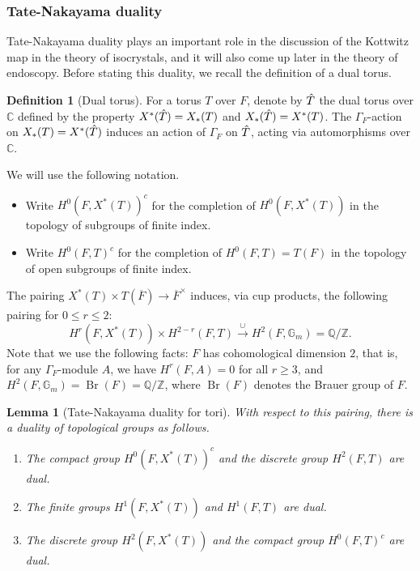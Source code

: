 \documentclass[11pt,a4paper]{article}
\theoremstyle{definition}
\newtheorem{D}[shared]{Definition}
\theoremstyle{plain}
\newtheorem{Le}[shared]{Lemma}
\theoremstyle{remark}
\theoremstyle{plain}
\DeclareMathOperator{\Br}{Br}
\begin{document}
\subsubsection{Tate-Nakayama duality}
Tate-Nakayama duality plays an important role in the discussion of the Kottwitz map in the theory of isocrystals, and it will also come up later in the theory of endoscopy. Before stating this duality, we recall the definition of a dual torus.
\begin{D}[Dual torus]\label{dualtorusdef}
    For a torus $T$ over $F$, denote by $\Hat{T}$ the dual torus over $\mathbb{C}$ defined by the property $X^*(\Hat{T}) = X_*(T)$ and $X_*(\Hat{T}) = X^*(T)$. The $\Gamma_F$-action on $X_*(T) = X^*(\Hat{T})$ induces an action of $\Gamma_F$ on $\Hat{T}$, acting via automorphisms over $\mathbb{C}$.
\end{D}

We will use the following notation.
\begin{itemize}
    \item Write $H^0(F, X^*(T))^c$ for the completion of $H^0(F,X^*(T))$ in the topology of subgroups of finite index.
    \item Write $H^0(F,T)^c$ for the completion of $H^0(F,T) = T(F)$ in the topology of open subgroups of finite index.
\end{itemize}

The pairing $X^*(T) \times T(\overline{F}) \xrightarrow[]{} \overline{F}^{\times}$ induces, via cup products, the following pairing for $0 \leq r \leq 2$:
$$H^r(F,X^*(T)) \times H^{2-r}(F,T) \xrightarrow[]{\cup} H^2(F, \mathbb{G}_m) = \mathbb{Q}/\mathbb{Z}.$$
Note that we use the following facts: $F$ has cohomological dimension $2$, that is, for any $\Gamma_F$-module $A$, we have $H^r(F,A) = 0$ for all $r \geq 3$, and $H^2(F,\mathbb{G}_m) = \Br(F) = \mathbb{Q}/\mathbb{Z}$, where $\Br(F)$ denotes the Brauer group of $F$.

\begin{Le}[Tate-Nakayama duality for tori]\label{tatenakayamatoriduality}
With respect to this pairing, there is a duality of topological groups as follows.
    \begin{enumerate}
        \item The compact group $H^0(F, X^*(T))^c$ and the discrete group $H^2(F,T)$ are dual.
        \item The finite groups $H^1(F,X^*(T))$ and $H^1(F,T)$ are dual.
        \item The discrete group $H^2(F,X^*(T))$ and the compact group $H^0(F,T)^c$ are dual.
    \end{enumerate}
\end{Le}
\end{document}
